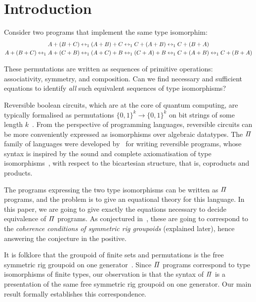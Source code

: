 \section{Introduction}
\label{sec:introduction}

Consider two programs that implement the same type isomorphim:
\begin{align*}
      A + (B + C) \leftrightarrow_1
      (A + B) + C & \leftrightarrow_1
      C + (A + B) \leftrightarrow_1
      C + (B + A)
      \\
      A + (B + C) \leftrightarrow_1
      A + (C + B) \leftrightarrow_1
      (A + C) + B & \leftrightarrow_1
      (C + A) + B \leftrightarrow_1
      C + (A + B) \leftrightarrow_1
      C + (B + A)
\end{align*}

These permutations are written as sequences of primitive operations: associativity, symmetry, and composition. Can we
find necessary and sufficient equations to identify \emph{all} such equivalent sequences of type isomorphisms?

Reversible boolean circuits, which are at the core of quantum computing, are typically formalised as permutations
$\{0,1\}^k \to \{0,1\}^k$ on bit strings of some length $k$~\cite{aaronson_et_al:LIPIcs:2017:8173,1201583}. From the
perspective of programming languages, reversible circuits can be more conveniently expressed as isomorphisms over
algebraic datatypes. The $\mathit{\Pi}$ family of languages were developed by~\citet*{jamesInformationEffects2012,theseus}
for writing reversible programs, whose syntax is inspired by the sound and complete axiomatisation of type
isomorphisms~\cite{fioreRemarksIsomorphismsTyped2002}, with respect to the bicartesian structure, that is, coproducts
and products.

The programs expressing the two type isomorphisms can be written as $\mathit{\Pi}$ programs, and the problem is to give an
equational theory for this language. In this paper, we are going to give exactly the equations necessary to decide
equivalence of $\mathit{\Pi}$ programs. As conjectured in~\cite{caretteComputingSemiringsWeak2016}, these are going to
correspond to the \emph{coherence conditions of symmetric rig groupoids} (explained later), hence answering the
conjecture in the positive.

It is folklore that the groupoid of finite sets and permutations is the free symmetric rig groupoid on one
generator~\cite{laplaza72,kelly74,baez2000finite}. Since $\mathit{\Pi}$ programs correspond to type isomorphisms of finite
types, our observation is that the syntax of $\mathit{\Pi}$ is a presentation of the same free symmetric rig groupoid on one
generator. Our main result formally establishes this correspondence.

